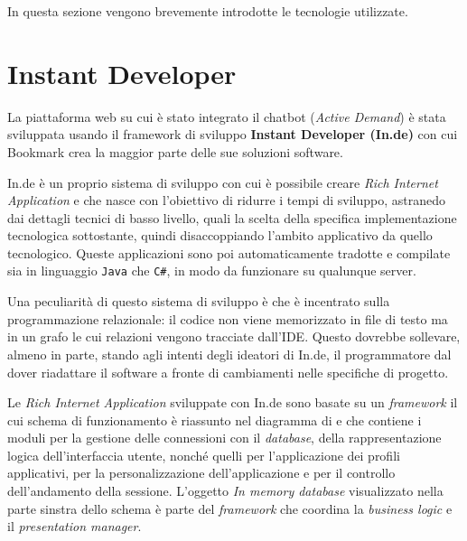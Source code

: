 In questa sezione vengono brevemente introdotte le tecnologie utilizzate.

\section{Instant Developer}
La piattaforma web su cui è stato integrato il chatbot (\textit{Active Demand}) è stata sviluppata usando il framework di sviluppo \textbf{Instant Developer (In.de)} con cui Bookmark crea la maggior parte delle sue soluzioni software.

In.de è un proprio sistema di sviluppo con cui è possibile creare \textit{Rich Internet Application} e che nasce con l'obiettivo di ridurre i tempi di sviluppo, astranedo dai dettagli tecnici di basso livello, quali la scelta della specifica implementazione tecnologica sottostante, quindi disaccoppiando l'ambito applicativo da quello tecnologico.
%
Queste applicazioni sono poi automaticamente tradotte e compilate sia in linguaggio \texttt{Java} che \texttt{C\#}, in modo da funzionare su qualunque server. 

Una peculiarità di questo sistema di sviluppo è che è incentrato sulla programmazione relazionale: il codice non viene memorizzato in file di testo ma in un grafo le cui relazioni vengono tracciate dall'IDE. 
%
Questo dovrebbe sollevare, almeno in parte, stando agli intenti degli ideatori di In.de, il programmatore dal dover riadattare il software a fronte di cambiamenti nelle specifiche di progetto.

Le \textit{Rich Internet Application} sviluppate con In.de sono basate su un \textit{framework} il cui schema di funzionamento è riassunto nel diagramma di  e che contiene i moduli per la gestione delle connessioni con il \textit{database}, della rappresentazione logica dell'interfaccia utente, nonché quelli per l'applicazione dei profili applicativi, per la personalizzazione dell'applicazione e per il controllo dell'andamento della sessione. 
%
L'oggetto \textit{In memory database} visualizzato nella parte sinstra dello schema è parte del \textit{framework} che coordina la \textit{business logic} e il \textit{presentation manager}.

